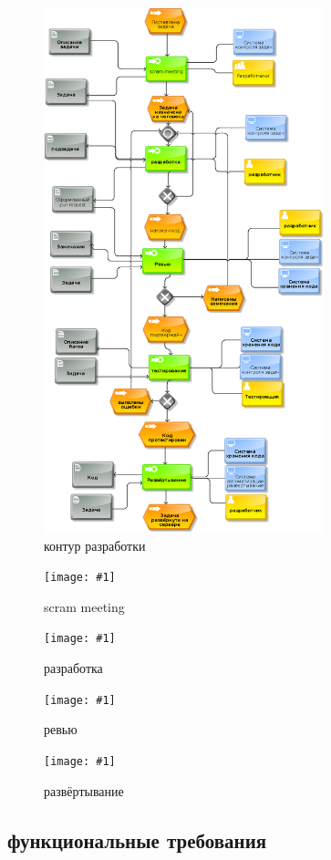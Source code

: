 \documentclass{article}
\begin{document}
\newcommand{\dia}[2]{
    \begin{figure}[!h]
        \texttt{[image: \#1]}
        \caption{#2 \cite{wiki}}
    \end{figure}
    \pagebreak
}

\begin{figure}[h!]
    \includegraphics[height=6in]{pictures/2.png}
    \caption{контур разработки \cite{wiki}}
\end{figure}
\pagebreak
\dia{pictures/3.png}{scram meeting}
\dia{pictures/4.png}{разработка}
\dia{pictures/5.png}{ревью}
\dia{pictures/7.png}{развёртывание}

\subsection{функциональные требования}
\end{document}
